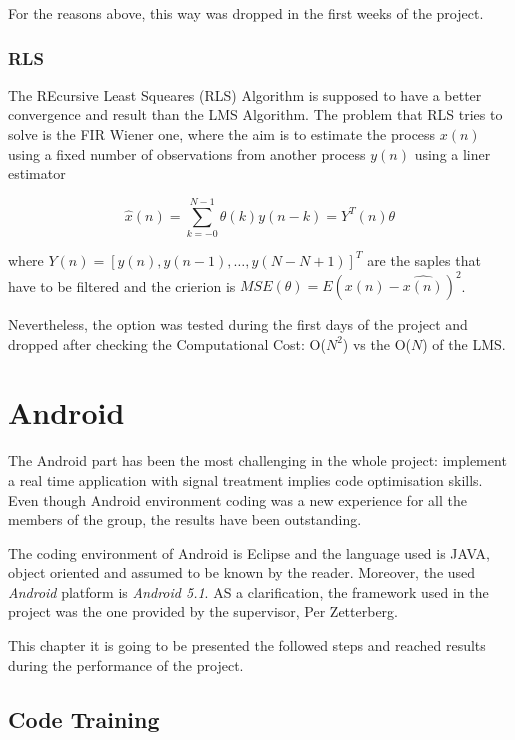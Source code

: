 \documentclass[11pt,a4paper,english]{book}  %
\theoremstyle{definition}  %
\theoremstyle{plain}  %
\theoremstyle{remark}  %
\begin{document}
	For the reasons above, this way was dropped in the first weeks of the project.
	
	\subsection{RLS}
	
	The REcursive Least Squeares (RLS) Algorithm \cite{asp} is supposed to have a better convergence and result than the LMS Algorithm. The problem that RLS tries to solve is the FIR Wiener one, where the aim is to estimate the process $x(n)$ using a fixed number of observations from another process ${y(n)}$ using a liner estimator
	
	\begin{equation}
	\hat{x}(n)=\sum \limits_{k=-0}^{N-1} \theta(k)y(n-k)=Y^T (n)\theta
	\end{equation}
	
	where $Y(n)= [y(n),y(n-1),\dots,y(N-N+1)]^T$ are the saples that have to be filtered and the crierion is $MSE(\theta)=E{(x(n)-\hat{x(n)})^2}$.
	
	Nevertheless, the option was tested during the first days of the project and dropped after checking the Computational Cost: O($N^2$) vs the  O($N$) of the LMS.



\chapter{Android}

The Android part has been the most challenging in the whole project: implement a real time application with signal treatment implies code optimisation skills. Even though Android environment coding was a new experience for all the members of the group, the results have been outstanding.

The coding environment of Android is Eclipse and the language used is JAVA, object oriented and assumed to be known by the reader. Moreover, the used \textit{Android} platform is \textit{Android 5.1}. AS a clarification, the framework used in the project was the one provided by the supervisor, Per Zetterberg.

This chapter it is going to be presented the followed steps and reached results during the performance of the project.

\section{Code Training}
\end{document}
